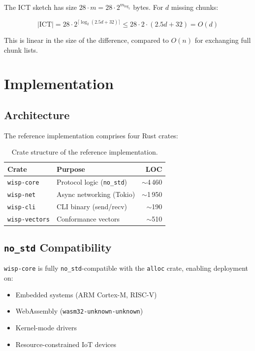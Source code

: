 \documentclass[11pt,twocolumn]{article}
\theoremstyle{definition}
\begin{document}
The ICT sketch has size $28 \cdot m = 28 \cdot 2^{m_{\log_2}}$ bytes.
For $d$ missing chunks:

\begin{equation}
  |\text{ICT}| = 28 \cdot 2^{\lceil \log_2(2.5d + 32) \rceil}
  \leq 28 \cdot 2 \cdot (2.5d + 32)
  = O(d)
\end{equation}

This is linear in the size of the difference, compared to $O(n)$ for
exchanging full chunk lists.


\section{Implementation}
\label{sec:impl}

\subsection{Architecture}

The reference implementation comprises four Rust crates:

\begin{table}[t]
\centering
\caption{Crate structure of the reference implementation.}
\label{tab:crates}
\begin{tabular}{@{}llr@{}}
\toprule
Crate & Purpose & LOC \\
\midrule
\texttt{wisp-core}    & Protocol logic (\texttt{no\_std}) & $\sim$4\,460 \\
\texttt{wisp-net}     & Async networking (Tokio)           & $\sim$1\,950 \\
\texttt{wisp-cli}     & CLI binary (send/recv)             & $\sim$190 \\
\texttt{wisp-vectors} & Conformance vectors                & $\sim$510 \\
\bottomrule
\end{tabular}
\end{table}

\subsection{\texttt{no\_std} Compatibility}

\texttt{wisp-core} is fully \texttt{no\_std}-compatible with the
\texttt{alloc} crate, enabling deployment on:
\begin{itemize}
  \item Embedded systems (ARM Cortex-M, RISC-V)
  \item WebAssembly (\texttt{wasm32-unknown-unknown})
  \item Kernel-mode drivers
  \item Resource-constrained IoT devices
\end{itemize}
\end{document}
